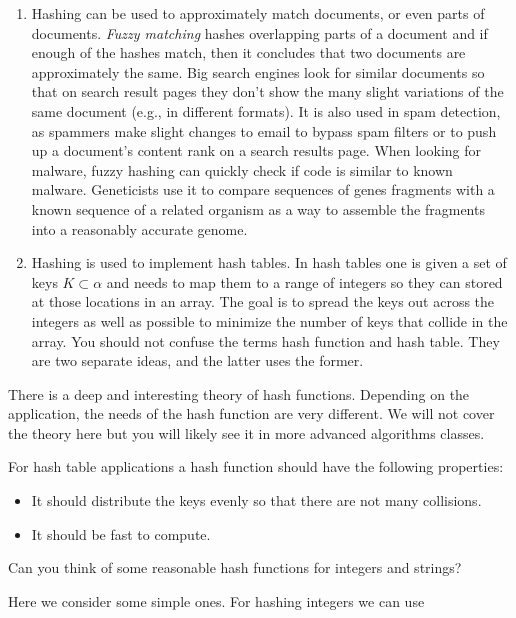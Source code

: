 \begin{enumerate}
\item
 Hashing can be used to approximately match documents, or even parts
 of documents. \emph{Fuzzy matching} hashes overlapping parts of a
 document and if enough of the hashes match, then it concludes that
 two documents are approximately the same. Big search engines look for
 similar documents so that on search result pages they don't show the
 many slight variations of the same document (e.g., in different
 formats). It is also used in spam detection, as spammers make slight
 changes to email to bypass spam filters or to push up a document's
 content rank on a search results page. When looking for malware,
 fuzzy hashing can quickly check if code is similar to known malware.
 Geneticists use it to compare sequences of genes fragments with a
 known sequence of a related organism as a way to assemble the
 fragments into a reasonably accurate genome.

\item Hashing is used to implement hash tables.  In hash tables one is
  given a set of keys $K \subset \alpha$ and needs to map them to a
  range of integers so they can stored at those locations in an array.
  The goal is to spread the keys out across the integers as well as
  possible to minimize the number of keys that collide in the array.
  You should not confuse the terms hash function and hash table.  They
  are two separate ideas, and the latter uses the former.
\end{enumerate}

There is a deep and interesting theory of hash functions.  Depending
on the application, the needs of the hash function are very different.
We will not cover the theory here but you will likely see it in more
advanced algorithms classes.

For hash table applications a hash function should have the following
properties:
\begin{itemize}
\item It should distribute the keys evenly so that there are not many
  collisions.
\item It should be fast to compute.
\end{itemize}

\begin{question}
Can you think of some reasonable hash functions for integers and strings?
\end{question}

Here we consider some simple
ones.  For hashing integers we can use

